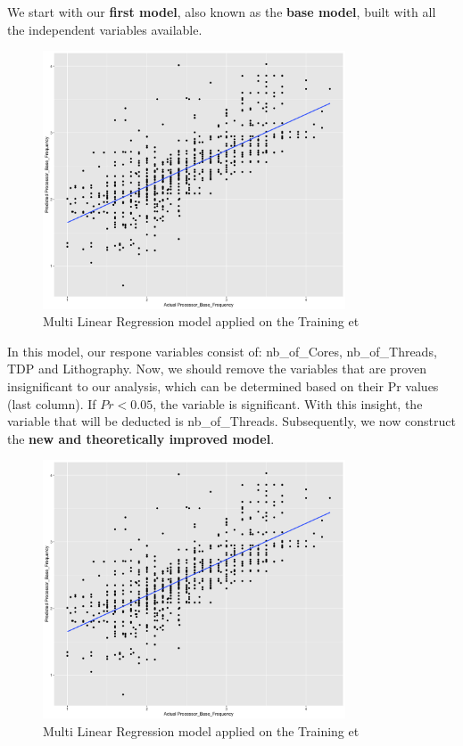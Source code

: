 We start with our \textbf{first model}, also known as the \textbf{base model}, built with all the independent variables available. \\

\begin{figure}[H]
    \centering
    \includegraphics[width=0.8\textwidth]{graphics/train_test_graph.png}
    \caption{Multi Linear Regression model applied on the Training et}
    \label{fig:train_test_graph}
\end{figure}


In this model, our respone variables consist of: nb\_of\_Cores, nb\_of\_Threads, TDP and Lithography. Now, we should remove the variables that are proven insignificant to our analysis, which can be determined based on their Pr values (last column). If $Pr < 0.05$, the variable is significant. With this insight, the variable that will be deducted is nb\_of\_Threads. Subsequently, we now construct the \textbf{new and theoretically improved model}. \\

\begin{figure}[H]
    \centering
    \includegraphics[width=0.8\textwidth]{graphics/train_test_graph.png}
    \caption{Multi Linear Regression model applied on the Training et}
    \label{fig:train_test_graph}
\end{figure}

